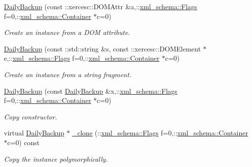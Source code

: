 \begin{DoxyCompactItemize}
\hyperlink{classopenstack_1_1xml_1_1DailyBackup_a8dfdfc64346cda57d86e8d857e0563fd}{DailyBackup} (const ::xercesc::DOMAttr \&a,::\hyperlink{namespacexml__schema_affb4c227cbd9aa7453dd1dc5a1401943}{xml\_\-schema::Flags} f=0,::\hyperlink{namespacexml__schema_a333dea2213742aea47a37532dec4ec27}{xml\_\-schema::Container} $\ast$c=0)
\begin{DoxyCompactList}\small\item\em Create an instance from a DOM attribute. \item\end{DoxyCompactList}\item 
\hyperlink{classopenstack_1_1xml_1_1DailyBackup_a69aa4ea3bc6e35455d84d50ea6952675}{DailyBackup} (const ::std::string \&s, const ::xercesc::DOMElement $\ast$e,::\hyperlink{namespacexml__schema_affb4c227cbd9aa7453dd1dc5a1401943}{xml\_\-schema::Flags} f=0,::\hyperlink{namespacexml__schema_a333dea2213742aea47a37532dec4ec27}{xml\_\-schema::Container} $\ast$c=0)
\begin{DoxyCompactList}\small\item\em Create an instance from a string fragment. \item\end{DoxyCompactList}\item 
\hyperlink{classopenstack_1_1xml_1_1DailyBackup_a89b631cd2d358df0ca630b95d6804468}{DailyBackup} (const \hyperlink{classopenstack_1_1xml_1_1DailyBackup}{DailyBackup} \&x,::\hyperlink{namespacexml__schema_affb4c227cbd9aa7453dd1dc5a1401943}{xml\_\-schema::Flags} f=0,::\hyperlink{namespacexml__schema_a333dea2213742aea47a37532dec4ec27}{xml\_\-schema::Container} $\ast$c=0)
\begin{DoxyCompactList}\small\item\em Copy constructor. \item\end{DoxyCompactList}\item 
virtual \hyperlink{classopenstack_1_1xml_1_1DailyBackup}{DailyBackup} $\ast$ \hyperlink{classopenstack_1_1xml_1_1DailyBackup_abef53ae5fd001a089c03d3357b50f037}{\_\-clone} (::\hyperlink{namespacexml__schema_affb4c227cbd9aa7453dd1dc5a1401943}{xml\_\-schema::Flags} f=0,::\hyperlink{namespacexml__schema_a333dea2213742aea47a37532dec4ec27}{xml\_\-schema::Container} $\ast$c=0) const 
\begin{DoxyCompactList}\small\item\em Copy the instance polymorphically. \item\end{DoxyCompactList}\item 

\end{DoxyCompactItemize}
